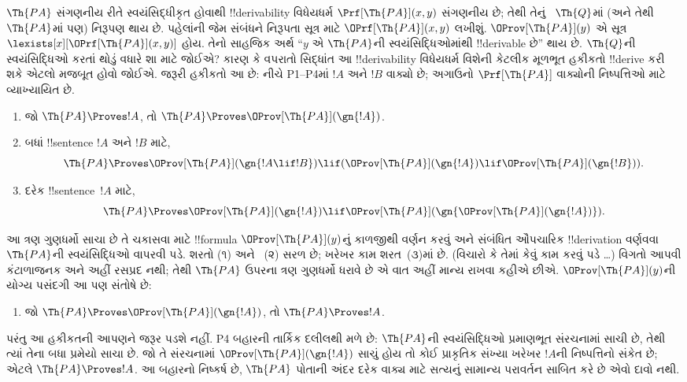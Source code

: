 \documentclass[../../../include/open-logic-section]{subfiles}
\begin{document}
$\Th{PA}$ સંગણનીય રીતે
સ્વયંસિદ્ધીકૃત હોવાથી
!!{derivability} વિધેયધર્મ
$\Prf[\Th{PA}](x,y)$
સંગણનીય છે; તેથી તેનું
~$\Th{Q}$માં (અને તેથી
~$\Th{PA}$માં પણ)
નિરૂપણ થાય છે. પહેલાંની
જેમ સંબંધને નિરૂપતા
સૂત્ર માટે
$\OPrf[\Th{PA}](x,y)$
લખીશું. $\OProv[\Th{PA}](y)$
એ સૂત્ર
$\lexists[x][\OPrf[\Th{PA}](x,y)]$
હોય. તેનો સાહજિક અર્થ
``$y$ એ $\Th{PA}$ની
સ્વયંસિદ્ધિઓમાંથી
!!{derivable} છે'' થાય છે.
$\Th{Q}$ની સ્વયંસિદ્ધિઓ
કરતાં થોડું વધારે
શા માટે જોઈએ?
કારણ કે વપરાતો સિદ્ધાંત
આ !!{derivability}
વિધેયધર્મ વિશેની કેટલીક
મૂળભૂત હકીકતો
!!{derive} કરી શકે એટલો
મજબૂત હોવો જોઈએ.
જરૂરી હકીકતો આ છે:
નીચે P1--P4માં $!A$ અને $!B$ વાક્યો છે;
અગાઉનો $\Prf[\Th{PA}]$ વાક્યોની નિષ્પત્તિઓ માટે
વ્યાખ્યાયિત છે.
\begin{enumerate}
\item[P1.] જો
  $\Th{PA} \Proves !A$,
  તો $\Th{PA} \Proves
  \OProv[\Th{PA}](\gn{!A})$.
\item[P2.] બધાં
  !!{sentence} $!A$ અને
  $!B$ માટે,
  \[
  \Th{PA} \Proves \OProv[\Th{PA}](\gn{!A \lif !B}) \lif
  (\OProv[\Th{PA}](\gn{!A}) \lif \OProv[\Th{PA}](\gn{!B})).
  \]
\item[P3.] દરેક
  !!{sentence}~$!A$ માટે,
  \[
  \Th{PA} \Proves \OProv[\Th{PA}](\gn{!A})
  \lif \OProv[\Th{PA}](\gn{\OProv[\Th{PA}](\gn{!A})}).
  \]
\end{enumerate}
આ ત્રણ ગુણધર્મો સાચા
છે તે ચકાસવા માટે
!!{formula}
$\OProv[\Th{PA}](y)$નું
કાળજીથી વર્ણન કરવું અને
સંબંધિત ઔપચારિક
!!{derivation} વર્ણવવા
$\Th{PA}$ની
સ્વયંસિદ્ધિઓ વાપરવી
પડે. શરતો (૧) અને
~(૨) સરળ છે; ખરેખર
કામ શરત~(૩)માં છે.
(વિચારો કે તેમાં કેવું
કામ કરવું પડે \dots)
વિગતો આપવી કંટાળાજનક
અને અહીં રસપ્રદ નથી;
તેથી $\Th{PA}$ ઉપરના
ત્રણ ગુણધર્મો ધરાવે છે
એ વાત અહીં માન્ય રાખવા
કહીએ છીએ. $\OProv[\Th{PA}](y)$ની
યોગ્ય પસંદગી આ પણ
સંતોષે છે:
\begin{enumerate}
\item[P4.] જો
  $\Th{PA} \Proves \OProv[\Th{PA}](\gn{!A})$,
  તો $\Th{PA} \Proves !A$.
\end{enumerate}
પરંતુ આ હકીકતની
આપણને જરૂર પડશે નહીં.
P4 બહારની તાર્કિક દલીલથી મળે છે: $\Th{PA}$ની
સ્વયંસિદ્ધિઓ પ્રમાણભૂત સંરચનામાં સાચી છે, તેથી ત્યાં
તેના બધા પ્રમેયો સાચા છે. જો તે સંરચનામાં
$\OProv[\Th{PA}](\gn{!A})$ સાચું હોય તો કોઈ
પ્રાકૃતિક સંખ્યા ખરેખર $!A$ની નિષ્પત્તિનો સંકેત છે;
એટલે $\Th{PA}\Proves !A$. આ બહારનો નિષ્કર્ષ છે,
$\Th{PA}$ પોતાની અંદર દરેક વાક્ય માટે સત્યનું
સામાન્ય પરાવર્તન સાબિત કરે છે એવો દાવો નથી.
\end{document}
